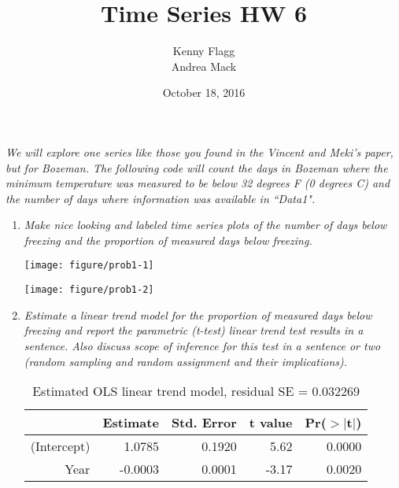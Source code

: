 \documentclass[11pt]{article}\usepackage[]{graphicx}\usepackage[]{color}
\title{Time Series HW 6}
\author{Kenny Flagg \\ Andrea Mack}
\date{October 18, 2016}
\makeatletter
\def\maxwidth{ %
  \ifdim\Gin@nat@width>\linewidth
    \linewidth
  \else
    \Gin@nat@width
  \fi
}
\newenvironment{knitrout}{}{} %
\makeatother
\begin{document}
\maketitle



{\it We will explore one series like those you found in the Vincent and Meki's paper, but for Bozeman. The following code will count the days in Bozeman where the minimum temperature was measured to be below 32 degrees F (0 degrees C) and the number of days where information was available in ``Data1". }



\begin{enumerate}

\item%
{\it Make nice looking and labeled time series plots of the number of days below freezing and the proportion of measured days below freezing.}

\begin{knitrout}\footnotesize
{}\color{fgcolor}

{\centering \texttt{[image: figure/prob1-1]} 

}




{\centering \texttt{[image: figure/prob1-2]} 

}



\end{knitrout}


\item%
{\it Estimate a linear trend model for the proportion of measured days below freezing and report the parametric (t-test) linear trend test results in a sentence. Also discuss scope of inference for this test in a sentence or two (random sampling and random assignment and their implications).}

\begin{table}[H]
\centering
\caption{Estimated OLS linear trend model, residual SE = 0.032269} 
\begin{tabular}{rrrrr}
  \hline
 & Estimate & Std. Error & t value & Pr($>$$|$t$|$) \\ 
  \hline
(Intercept) & 1.0785 & 0.1920 & 5.62 & 0.0000 \\ 
  Year & -0.0003 & 0.0001 & -3.17 & 0.0020 \\ 
   \hline
\end{tabular}
\end{table}



\end{enumerate}
\end{document}
